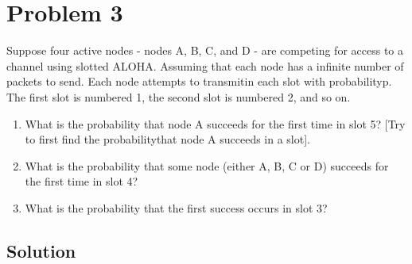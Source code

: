 
\section*{Problem 3}

Suppose four active nodes - nodes A, B, C, and D - are competing for access to a channel using slotted ALOHA.
Assuming that each node has a infinite number of packets to send. Each node attempts to transmitin each slot with probabilityp.
The first slot is numbered 1, the second slot is numbered 2, and so on.

\begin{enumerate}
    \item What is the probability that node A succeeds for the first time in slot 5?
          [Try to first find the probabilitythat node A succeeds in a slot].
    \item What is the probability that some node (either A, B, C or D) succeeds for the first time in slot 4?
    \item What is the probability that the first success occurs in slot 3?
\end{enumerate}

\subsection*{Solution}
